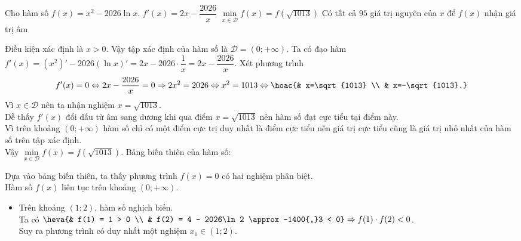 \begin{ex}%
	Cho hàm số $f(x) = x^2 - 2026\ln x$.
	{\True $f'(x) = 2x - \dfrac{2026}{x}$}
	{\True $\min\limits_{x\in\mathscr{D}} f(x) = f\left(\sqrt{1013}\right)$}
	{\True Có tất cả $95$ giá trị nguyên của $x$ để $f(x)$ nhận giá trị âm}
	\loigiai
	{
		\begin{itemchoice}
			\itemch Điều kiện xác định là $x > 0$. Vậy tập xác định của hàm số là $\mathscr{D} = (0; +\infty)$.
			\itemch Ta có đạo hàm $f'(x) = \left(x^2\right)' - 2026(\ln x)' = 2x - 2026 \cdot \dfrac{1}{x} = 2x - \dfrac{2026}{x}$.
			\itemch Xét phương trình
			\[f'(x) = 0 \Leftrightarrow 2x - \dfrac{2026}{x} = 0 \Rightarrow 2x^2 = 2026 \Leftrightarrow x^2 = 1013\Leftrightarrow \hoac{& x=\sqrt{1013} \\ & x=-\sqrt{1013}.}\]
			Vì $x \in \mathscr{D}$ nên ta nhận nghiệm $x = \sqrt{1013}$.\\
			Dễ thấy $f'(x)$ đổi dấu từ âm sang dương khi qua điểm $x = \sqrt{1013}$ nên hàm số đạt cực tiểu tại điểm này.\\
			Vì trên khoảng $(0; +\infty)$ hàm số chỉ có một điểm cực trị duy nhất là điểm cực tiểu nên giá trị cực tiểu cũng là giá trị nhỏ nhất của hàm số trên tập xác định.\\
			Vậy $\min\limits_{x\in\mathscr{D}} f(x) = f\left(\sqrt{1013}\right)$.
			\itemch Bảng biến thiên của hàm số:
			\begin{center}
			\end{center}
			Dựa vào bảng biến thiên, ta thấy phương trình $f(x)=0$ có hai nghiệm phân biệt.\\
			Hàm số $f(x)$ liên tục trên khoảng $(0; +\infty)$.
			\begin{itemize}
				\item Trên khoảng $(1; 2)$, hàm số nghịch biến.\\ Ta có
				$\heva{& f(1) = 1 > 0 \\ & f(2) = 4 - 2026\ln 2 \approx -1400{,}3 < 0} \Rightarrow f(1) \cdot f(2) < 0$.\\
				Suy ra phương trình có duy nhất một nghiệm $x_1 \in (1; 2)$.

\end{itemize}
\end{itemchoice}}
\end{ex}
